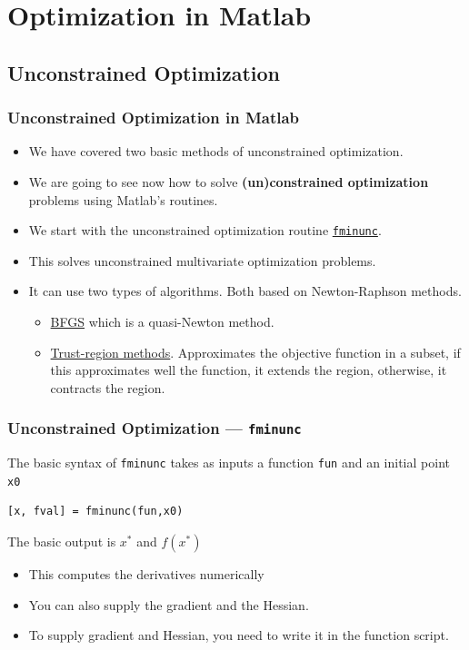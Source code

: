 \documentclass[11pt,xcolor={svgnames},aspectratio=169,usepdftitle=false,notheorems]{beamer}
\begin{document}
\section{Optimization in Matlab}

\subsection{Unconstrained Optimization}

\begin{frame}
  \frametitle{Unconstrained Optimization in Matlab}
\begin{itemize}
  \item We have covered two basic methods of unconstrained optimization.
  \item We are going to see now how to solve \alert{\textbf{(un)constrained optimization}} problems using Matlab's routines.
  \item We start with the unconstrained optimization routine \href{https://www.mathworks.com/help/optim/ug/fminunc.html}{\texttt{fminunc}}.
  \item This solves unconstrained multivariate optimization problems.
  \item It can use two types of algorithms. Both based on Newton-Raphson methods.
  \begin{itemize}
    \item \href{https://en.wikipedia.org/wiki/Broyden-Fletcher-Goldfarb-Shanno_algorithm}{BFGS} which is a quasi-Newton method.
    \item \href{https://www.mathworks.com/help/optim/ug/unconstrained-nonlinear-optimization-algorithms.html\#brnpcy5}{Trust-region methods}. Approximates the objective function in a subset, if this approximates well the function, it extends the region, otherwise, it contracts the region.
  \end{itemize}
\end{itemize}
\end{frame}

\begin{frame}[fragile]
  \frametitle{Unconstrained Optimization --- \texttt{fminunc}}
The basic syntax of \verb;fminunc; takes as inputs a function \verb;fun; and an initial point \verb;x0; 
\begin{lstlisting}
[x, fval] = fminunc(fun,x0)
\end{lstlisting}
The basic output is $x^*$ and $f(x^*)$

\begin{itemize}
  \item This computes the derivatives numerically
  \item You can also supply the gradient and the Hessian.
  \item To supply gradient and Hessian, you need to write it in the function script.
\end{itemize}
\end{frame}
\end{document}
